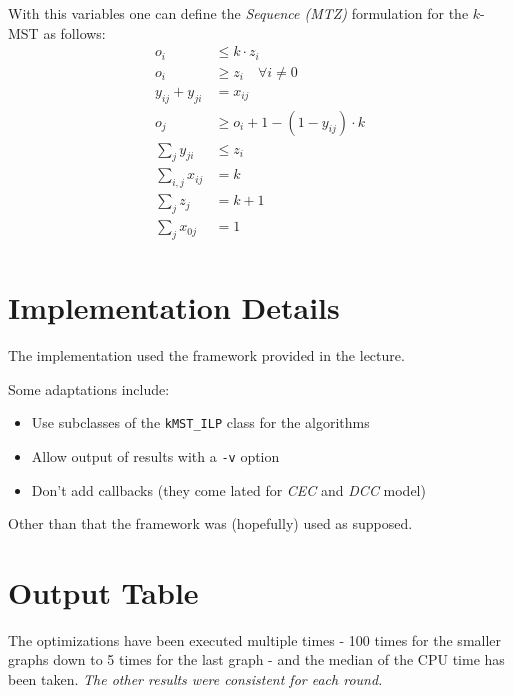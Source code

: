 \documentclass[11pt, oneside, a4paper, fleqn]{article}
\begin{document}
With this variables one can define the \emph{Sequence (MTZ)}
formulation for the $k$-MST as follows:
\begin{align}
  o_i & \le k\cdot z_i \\
  o_i & \ge z_i \quad \forall i \ne 0 \\
  y_{ij}+y_{ji} & = x_{ij} \\
  o_j & \ge o_i + 1 - (1 - y_{ij})\cdot k \\
  \sum_{j} y_{ji} & \le z_i \\
  \sum_{i,j} x_{ij} & = k \\
  \sum_{j} z_j & = k + 1 \\
  \sum_{j} x_{0j} & = 1 \\
\end{align}

\section*{Implementation Details}

The implementation used the framework provided in the lecture.

Some adaptations include:
\begin{itemize}
\item Use subclasses of the \texttt{kMST\_ILP} class
      for the algorithms
\item Allow output of results with a \texttt{-v} option
\item Don't add callbacks (they come lated for \emph{CEC} and \emph{DCC} model)
\end{itemize}

Other than that the framework was (hopefully) used as supposed.

\section*{Output Table}

The optimizations have been executed multiple times -
100 times for the smaller graphs down to 5 times for the last graph -
and the median of the CPU time has been taken.
\emph{The other results were consistent for each round.}
\end{document}
